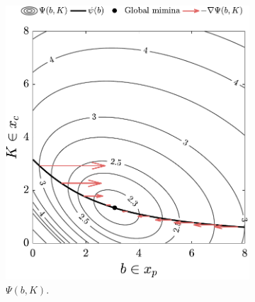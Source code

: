 \begin{figure}[t!]
\centering
\begin{subfigure}[b]{0.4\columnwidth}
       \centering
        \includegraphics[width=\textwidth]{../ch3/figures/T2_1_PSI}
        \caption{$\Psi(b,K)$.\label{fig:ch3:T2_1_PSI}}
\end{subfigure}%
\begin{subfigure}[b]{0.266666666667\columnwidth}
       \centering

\end{subfigure}
\end{figure}
